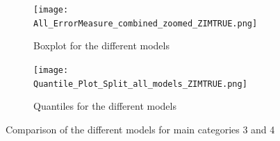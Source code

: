 \begin{figure}[htb!]
\centering
\begin{subfigure}[b]{0.8\textwidth}
\texttt{[image: All\_ErrorMeasure\_combined\_zoomed\_ZIMTRUE.png]}
\caption{Boxplot for the different models}
\label{fig:box distributions models Zim}
\end{subfigure}
\hfill
\begin{subfigure}[b]{0.8\textwidth}
\texttt{[image: Quantile\_Plot\_Split\_all\_models\_ZIMTRUE.png]}
\caption{Quantiles for the different models}
\label{fig: quantile distributions models Zim}
\end{subfigure}
\hfill
\caption{Comparison of the different models for main categories 3 and 4}
\label{fig:models Comp2}
\end{figure}

%
%
%
%
%

